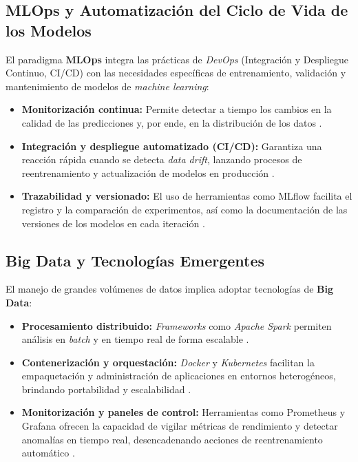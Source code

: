 \subsection{MLOps y Automatización del Ciclo de Vida de los Modelos}
El paradigma \textbf{MLOps} integra las prácticas de \textit{DevOps} (Integración y Despliegue Continuo, CI/CD) con las necesidades específicas de entrenamiento, validación y mantenimiento de modelos de \textit{machine learning}:

\begin{itemize}
    \item \textbf{Monitorización continua:} Permite detectar a tiempo los cambios en la calidad de las predicciones y, por ende, en la distribución de los datos \citep{Amershi2019}.
    \item \textbf{Integración y despliegue automatizado (CI/CD):} Garantiza una reacción rápida cuando se detecta \textit{data drift}, lanzando procesos de reentrenamiento y actualización de modelos en producción \citep{Chen2022, Kim2018}.
    \item \textbf{Trazabilidad y versionado:} El uso de herramientas como MLflow facilita el registro y la comparación de experimentos, así como la documentación de las versiones de los modelos en cada iteración \citep{Chen2022}.
\end{itemize}

\subsection{Big Data y Tecnologías Emergentes}
El manejo de grandes volúmenes de datos implica adoptar tecnologías de \textbf{Big Data}:
\begin{itemize}
    \item \textbf{Procesamiento distribuido:} \textit{Frameworks} como \textit{Apache Spark} permiten análisis en \textit{batch} y en tiempo real de forma escalable \citep{Chen2022}.
    \item \textbf{Contenerización y orquestación:} \textit{Docker} y \textit{Kubernetes} facilitan la empaquetación y administración de aplicaciones en entornos heterogéneos, brindando portabilidad y escalabilidad \citep{Merkel2014, Patel2020}.
    \item \textbf{Monitorización y paneles de control:} Herramientas como Prometheus y Grafana ofrecen la capacidad de vigilar métricas de rendimiento y detectar anomalías en tiempo real, desencadenando acciones de reentrenamiento automático \citep{Zhao2021}.
\end{itemize}

